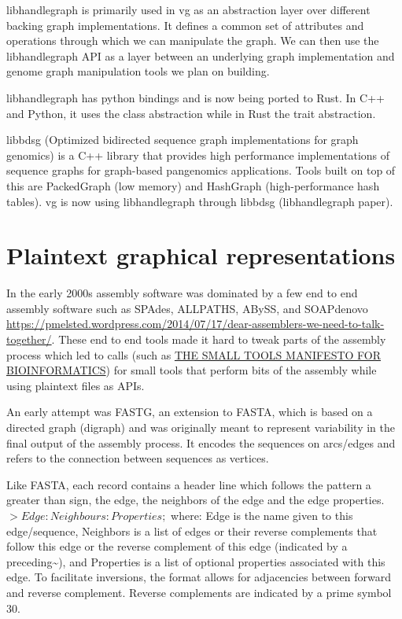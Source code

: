 \documentclass[11pt]{article}
\begin{document}
libhandlegraph is primarily used in vg as an abstraction layer over different
backing graph implementations.
It defines a common set of attributes and operations through which we can
manipulate the graph. We can then use the libhandlegraph API as a layer between
an underlying graph implementation and genome graph manipulation tools we plan 
on building.

libhandlegraph has python bindings and is now being ported to Rust. In C++ and 
Python, it uses the class abstraction while in Rust the trait abstraction.

libbdsg (Optimized bidirected sequence graph implementations for graph genomics)
is a C++ library that provides high performance implementations of sequence 
graphs for graph-based pangenomics applications. Tools built on top of this are
PackedGraph (low memory) and HashGraph (high-performance hash tables).
vg is now using libhandlegraph through libbdsg (libhandlegraph paper).

\section{Plaintext graphical representations}
\label{sec:org811773d}
In the early 2000s assembly software was dominated by a few end to end assembly
software such as SPAdes, ALLPATHS, ABySS, and SOAPdenovo
\url{https://pmelsted.wordpress.com/2014/07/17/dear-assemblers-we-need-to-talk-together/}.
These end to end tools made it hard to tweak parts of the assembly process which
led to calls (such as \href{https://github.com/pjotrp/bioinformatics\#the-small-tools-manifesto-for-bioinformatics}{THE SMALL TOOLS MANIFESTO FOR BIOINFORMATICS}) for small
tools that perform bits of the assembly while using plaintext files as APIs.

An early attempt was FASTG,  an extension to FASTA, which is based on a directed
graph (digraph) and was originally meant to represent variability in the final
output of the assembly process.
It encodes the sequences on arcs/edges and refers to the connection
between sequences as vertices.

Like FASTA, each record contains a header line which follows the pattern
a greater than sign, the edge, the neighbors of the edge and the edge properties.
\(>Edge:Neighbours:Properties;\) where: Edge is the name given to this 
edge/sequence, Neighbors is a list of edges or their reverse complements that
follow this edge or the reverse complement of this edge
(indicated by a preceding\textasciitilde{}), and Properties is a list of optional properties 
associated with this edge. To facilitate
inversions, the format allows for adjacencies between forward and reverse
complement. Reverse complements are indicated by a prime symbol 30\textprime.
\end{document}

